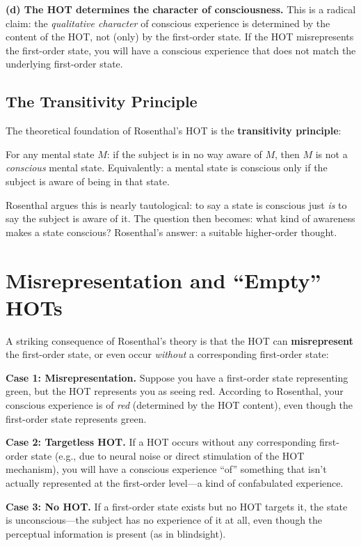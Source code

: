 \documentclass[11pt,a4paper]{report}
\begin{document}
\textbf{(d) The HOT determines the character of consciousness.} This is a radical claim: the \emph{qualitative character} of conscious experience is determined by the content of the HOT, not (only) by the first-order state. If the HOT misrepresents the first-order state, you will have a conscious experience that does not match the underlying first-order state.

\subsection{The Transitivity Principle}

The theoretical foundation of Rosenthal's HOT is the \textbf{transitivity principle}:

\begin{principlebox}
For any mental state $M$: if the subject is in no way aware of $M$, then $M$ is not a \emph{conscious} mental state. Equivalently: a mental state is conscious only if the subject is aware of being in that state.
\end{principlebox}

Rosenthal argues this is nearly tautological: to say a state is conscious just \emph{is} to say the subject is aware of it. The question then becomes: what kind of awareness makes a state conscious? Rosenthal's answer: a suitable higher-order thought.

\section{Misrepresentation and ``Empty'' HOTs}

A striking consequence of Rosenthal's theory is that the HOT can \textbf{misrepresent} the first-order state, or even occur \emph{without} a corresponding first-order state:

\begin{examplebox}
\textbf{Case 1: Misrepresentation.} Suppose you have a first-order state representing green, but the HOT represents you as seeing red. According to Rosenthal, your conscious experience is of \emph{red} (determined by the HOT content), even though the first-order state represents green.

\textbf{Case 2: Targetless HOT.} If a HOT occurs without any corresponding first-order state (e.g., due to neural noise or direct stimulation of the HOT mechanism), you will have a conscious experience ``of'' something that isn't actually represented at the first-order level---a kind of confabulated experience.

\textbf{Case 3: No HOT.} If a first-order state exists but no HOT targets it, the state is unconscious---the subject has no experience of it at all, even though the perceptual information is present (as in blindsight).
\end{examplebox}
\end{document}
